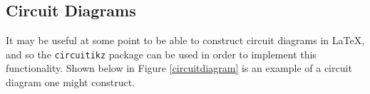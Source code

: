 \documentclass[11pt, twoside]{article}
\begin{document}







\subsection{Circuit Diagrams}

It may be useful at some point to be able to construct circuit diagrams in LaTeX, and so the \lstinline{circuitikz} package can be used in order to implement this functionality. Shown below in Figure \ref{circuitdiagram} is an example of a circuit diagram one might construct.

\end{document}
